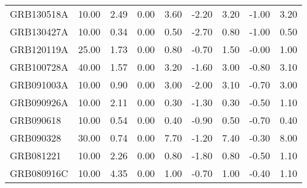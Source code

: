 \begin{tabular}{lrrrrrrrr}
GRB130518A & 10.00 & 2.49 & 0.00 & 3.60 & -2.20 & 3.20 & -1.00 & 3.20 \\
GRB130427A & 10.00 & 0.34 & 0.00 & 0.50 & -2.70 & 0.80 & -1.00 & 0.50 \\
GRB120119A & 25.00 & 1.73 & 0.00 & 0.80 & -0.70 & 1.50 & -0.00 & 1.00 \\
GRB100728A & 40.00 & 1.57 & 0.00 & 3.20 & -1.60 & 3.00 & -0.80 & 3.10 \\
GRB091003A & 10.00 & 0.90 & 0.00 & 3.00 & -2.00 & 3.10 & -0.70 & 3.00 \\
GRB090926A & 10.00 & 2.11 & 0.00 & 0.30 & -1.30 & 0.30 & -0.50 & 1.10 \\
GRB090618 & 10.00 & 0.54 & 0.00 & 0.40 & -0.90 & 0.50 & -0.70 & 0.40 \\
GRB090328 & 30.00 & 0.74 & 0.00 & 7.70 & -1.20 & 7.40 & -0.30 & 8.00 \\
GRB081221 & 10.00 & 2.26 & 0.00 & 0.80 & -1.80 & 0.80 & -0.50 & 1.10 \\
GRB080916C & 10.00 & 4.35 & 0.00 & 1.00 & -0.70 & 1.00 & -0.40 & 1.10 \\
\bottomrule
\end{tabular}
